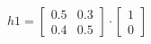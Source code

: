 \documentclass{article}
\begin{document}
\[
h1 =
\begin{bmatrix}
{0.5} & {0.3} \\
{0.4} & {0.5}
\end{bmatrix}
\cdot
\begin{bmatrix}
{1} \\ {0}
\end{bmatrix}
\]

\medskip
\end{document}
